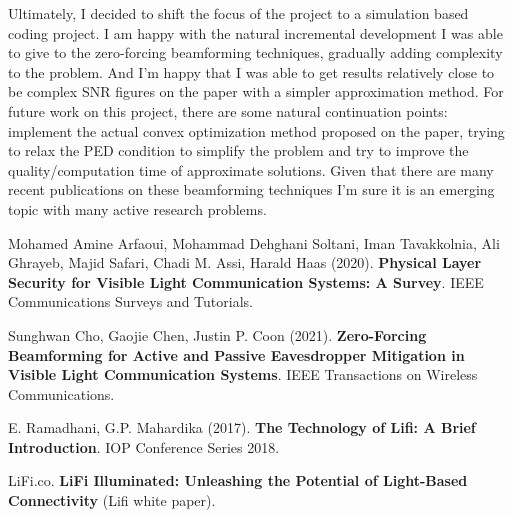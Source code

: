 \documentclass[a4paper,12pt,twoside]{article}
\begin{document}
	Ultimately, I decided to shift the focus of the project to a simulation based coding project. I am happy with the natural incremental development I was able to give to the zero-forcing beamforming techniques, gradually adding complexity to the problem. And I'm happy that I was able to get results relatively close to be complex SNR figures on the paper with a simpler approximation method. For future work on this project, there are some natural continuation points: implement the actual convex optimization method proposed on the paper, trying to relax the PED condition to simplify the problem and try to improve the quality/computation time of approximate solutions. Given that there are many recent publications on these beamforming techniques I'm sure it is an emerging topic with many active research problems.
	
	\newpage 

	\begin{thebibliography}{9}
		 Mohamed Amine Arfaoui, Mohammad Dehghani Soltani, Iman Tavakkolnia, Ali Ghrayeb, Majid Safari, Chadi M. Assi, Harald Haas (2020). \textbf{Physical Layer Security for Visible Light
		Communication Systems: A Survey}. IEEE Communications Surveys and Tutorials.
		
		Sunghwan Cho, Gaojie Chen, Justin P. Coon (2021). \textbf{Zero-Forcing Beamforming for Active and Passive Eavesdropper Mitigation in Visible Light Communication Systems}. IEEE Transactions on Wireless Communications.
		
		E. Ramadhani, G.P. Mahardika (2017). \textbf{The Technology of Lifi: A Brief Introduction}. IOP Conference Series 2018.
		
		LiFi.co. \textbf{LiFi Illuminated: Unleashing the Potential of Light-Based Connectivity} (Lifi white paper).
	\end{thebibliography}
	
\end{document}

